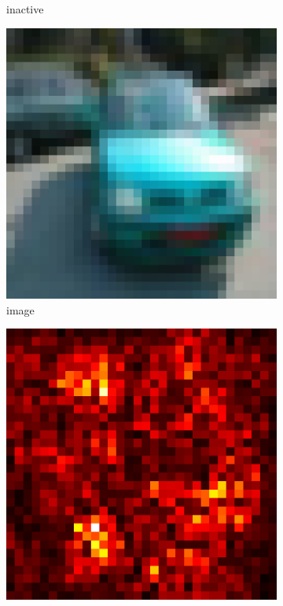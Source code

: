 \documentclass[preprint,12pt]{elsarticle}
\begin{document}
\begin{figure}
\begin{subfigure}{0.14\textwidth}
        \caption{inactive}
    \end{subfigure}
    \begin{subfigure}{0.14\linewidth}
        \centering
        \includegraphics[width=\linewidth]{../visualizations/examples/cifar10/resnet18/images/1.png}
        \caption{image}
    \end{subfigure}
    \hfill
    \begin{subfigure}{0.14\linewidth}
        \centering
        \includegraphics[width=\linewidth]{../visualizations/examples/cifar10/resnet18/saliency_map/1.png}

\end{subfigure}
\end{figure}
\end{document}
